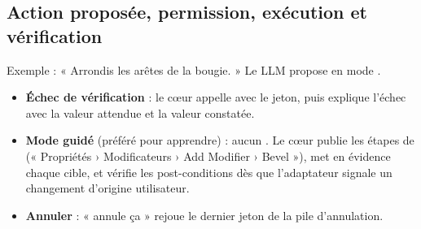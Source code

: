 \subsection{Action proposée, permission, exécution et vérification}

Exemple : « Arrondis les arêtes de la bougie. » Le LLM propose  en mode .

\begin{center}
\end{center}

\begin{itemize}[leftmargin=1.2em]
  \item \textbf{Échec de vérification} : le cœur appelle  avec le jeton, puis explique l'échec avec la valeur attendue et la valeur constatée.
  \item \textbf{Mode guidé} (préféré pour apprendre) : aucun . Le cœur publie les étapes de  (« Propriétés › Modificateurs › Add Modifier › Bevel »), met en évidence chaque cible, et vérifie les post-conditions dès que l'adaptateur signale un changement d'origine utilisateur.
  \item \textbf{Annuler} : « annule ça » rejoue le dernier jeton de la pile d'annulation.
\end{itemize}

